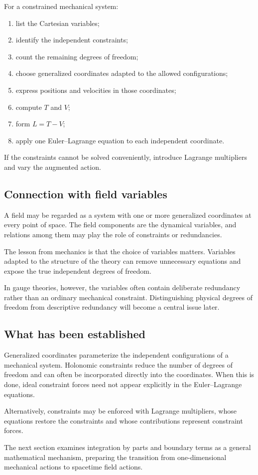 For a constrained mechanical system:

\begin{enumerate}
    \item list the Cartesian variables;
    \item identify the independent constraints;
    \item count the remaining degrees of freedom;
    \item choose generalized coordinates adapted to the allowed configurations;
    \item express positions and velocities in those coordinates;
    \item compute \(T\) and \(V\);
    \item form \(L=T-V\);
    \item apply one Euler--Lagrange equation to each independent coordinate.
\end{enumerate}

If the constraints cannot be solved conveniently, introduce Lagrange multipliers and vary the augmented action.

\subsection{Connection with field variables}

A field may be regarded as a system with one or more generalized coordinates at every point of space. The field components are the dynamical variables, and relations among them may play the role of constraints or redundancies.

The lesson from mechanics is that the choice of variables matters. Variables adapted to the structure of the theory can remove unnecessary equations and expose the true independent degrees of freedom.

In gauge theories, however, the variables often contain deliberate redundancy rather than an ordinary mechanical constraint. Distinguishing physical degrees of freedom from descriptive redundancy will become a central issue later.

\subsection{What has been established}

Generalized coordinates parameterize the independent configurations of a mechanical system. Holonomic constraints reduce the number of degrees of freedom and can often be incorporated directly into the coordinates. When this is done, ideal constraint forces need not appear explicitly in the Euler--Lagrange equations.

Alternatively, constraints may be enforced with Lagrange multipliers, whose equations restore the constraints and whose contributions represent constraint forces.

The next section examines integration by parts and boundary terms as a general mathematical mechanism, preparing the transition from one-dimensional mechanical actions to spacetime field actions.